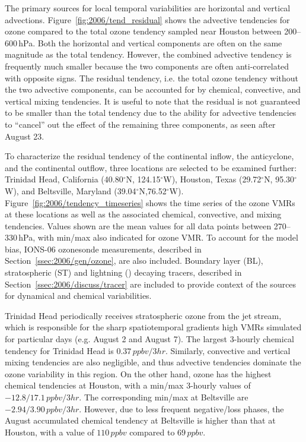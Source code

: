 The primary sources for local temporal variabilities are horizontal and vertical advections. Figure~\ref{fig:2006/tend_residual} shows
the advective tendencies for ozone compared to the total ozone tendency sampled near Houston between 200--600\,\unit{hPa}.
Both the horizontal and vertical components are often on the same magnitude as the total tendency. However, the combined
advective tendency is frequently much smaller because the two components are often anti-correlated with opposite signs. The residual
tendency, i.e. the total ozone tendency without the two advective components, can be accounted for by chemical, convective, and
vertical mixing tendencies. It is useful to note that the residual is not guaranteed to be smaller than the total tendency due to the ability for advective tendencies
to ``cancel'' out the effect of the remaining three components, as seen after August 23.

To characterize the residual tendency of the continental inflow, the anticyclone, and the continental outflow, three locations are selected to be
examined further: Trinidad Head, California (40.80$^\circ$N, 124.15$^\circ$W), Houston, Texas (29.72$^\circ$N, 95.30$^\circ$W),
and Beltsville, Maryland (39.04$^\circ$N,76.52$^\circ$W). Figure~\ref{fig:2006/tendency_timeseries} shows the time series of the
ozone VMRs at these locations as well as the associated chemical, convective, and mixing tendencies. Values shown are the mean values for
all data points between 270--330\,\unit{hPa}, with min/max also indicated for ozone VMR.
To account for the model bias, IONS-06 ozonesonde measurements, described in Section~\ref{ssec:2006/gen/ozone}, are also included.
Boundary layer (BL), stratospheric (ST) and lightning (\lnox) decaying tracers, described in Section~\ref{ssec:2006/discuss/tracer}
are included to provide context of the sources for dynamical and chemical variabilities.

Trinidad Head periodically receives stratospheric ozone from the jet stream, which is responsible for the sharp spatiotemporal gradients
high VMRs simulated for particular days (e.g. August 2 and August 7). The largest 3-hourly chemical tendency for Trinidad Head is
$0.37\,\unit{ppbv/3 hr}$. Similarly, convective and vertical mixing tendencies are also negligible, and thus advective tendencies dominate
the ozone variability in this region. On the other hand, ozone has the highest chemical tendencies at Houston, with a min/max 3-hourly values of
$-12.8/17.1\,\unit{ppbv/3 hr}$. The corresponding min/max at Beltsville are $-2.94/3.90\,\unit{ppbv/3 hr}$. However, due to less frequent
negative/loss phases, the August accumulated chemical tendency at Beltsville is higher than that at Houston, with a value of $110\,\unit{ppbv}$
compared to $69\,\unit{ppbv}$. 

